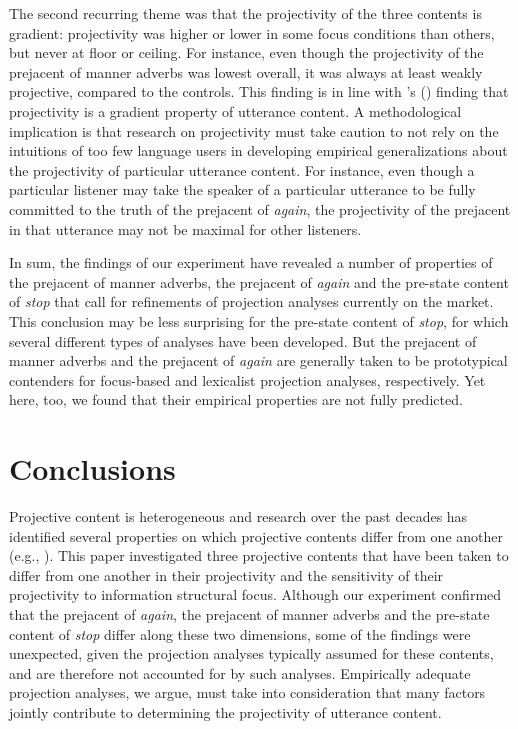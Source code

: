 \documentclass[a4paper,12pt]{article}
\newcommand{\6}{\mbox{$[\hspace*{-.6mm}[$}}
\newcommand{\9}{\mbox{$]\hspace*{-.6mm}]$}}
\newcommand{\citetpos}[1]{\citeauthor{#1}'s (\citeyear{#1})}
\begin{document}
The second recurring theme was that the projectivity of the three contents is gradient: projectivity was higher or lower  in some focus conditions than others, but never at floor or ceiling. For instance, even though the projectivity of the prejacent of manner adverbs was lowest overall, it was always at least weakly projective, compared to the controls. This finding is in line with \citetpos{tbd-variability} finding that projectivity is a gradient property of utterance content. A methodological implication is that research on projectivity must take caution to not rely on the intuitions of too few language users in developing empirical generalizations about the projectivity of particular utterance content. For instance, even though a particular listener may take the speaker of a particular utterance to be fully committed to the truth of the prejacent of {\em again}, the projectivity of the prejacent in that utterance may not be maximal for other listeners. 

In sum, the findings of our experiment have revealed a number of properties of the prejacent of manner adverbs, the prejacent of {\em again} and the pre-state content of {\em stop} that call for refinements of projection analyses currently on the market. This conclusion may be less surprising for the pre-state content of {\em stop}, for which several different types of analyses have been developed.  But the prejacent of manner adverbs and the prejacent of {\em again} are generally taken to be prototypical contenders for focus-based and lexicalist projection analyses, respectively. Yet here, too, we found that their empirical properties are not fully predicted. 


\section{Conclusions}

Projective content is heterogeneous and research over the past decades has identified several properties on which projective contents differ from one another (e.g., \citealt{ccmg90,kadmon01,potts05,brst-lang11,tbd-variability}). This paper investigated three projective contents that have  been taken to differ from one another in their projectivity and the sensitivity of their projectivity to information structural focus. Although our experiment confirmed that the prejacent of {\em again}, the prejacent of manner adverbs and the pre-state content of {\em stop} differ along these two dimensions, some of the findings were unexpected, given the projection analyses typically assumed for these contents, and are therefore not accounted for by such analyses. Empirically adequate projection analyses, we argue, must take into consideration that many factors jointly contribute to determining the projectivity of utterance content.




\end{document}
